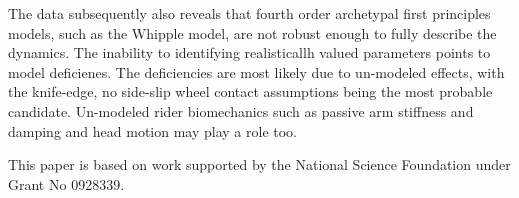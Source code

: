 \documentclass{article}
\begin{document}
The data subsequently also reveals that fourth order archetypal first
principles models, such as the Whipple model, are not robust enough to fully
describe the dynamics. The inability to identifying realisticallh valued
parameters points to model deficienes. The deficiencies are most likely due to
un-modeled effects, with the knife-edge, no side-slip wheel contact assumptions
being the most probable candidate. Un-modeled rider biomechanics such as
passive arm stiffness and damping and head motion may play a role too.

This paper is based on work supported by the National Science Foundation under
Grant No 0928339.



\end{document}
